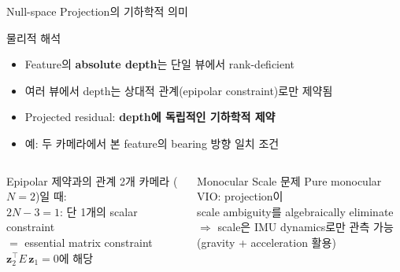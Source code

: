 \begin{frame}{Null-space Projection의 기하학적 의미}
  \begin{block}{물리적 해석}
    \begin{itemize}
      \item Feature의 \textbf{absolute depth}는 단일 뷰에서 rank-deficient
      \item 여러 뷰에서 depth는 상대적 관계(epipolar constraint)로만 제약됨
      \item Projected residual: \textbf{depth에 독립적인 기하학적 제약}
      \item 예: 두 카메라에서 본 feature의 bearing 방향 일치 조건
    \end{itemize}
  \end{block}
  \begin{columns}[T]
      \begin{exampleblock}{Epipolar 제약과의 관계}
        2개 카메라 ($N=2$)일 때:\\
        $2N - 3 = 1$: 단 1개의 scalar constraint\\
        $=$ essential matrix constraint\\
        $\bm{z}_2^\top E\, \bm{z}_1 = 0$에 해당
      \end{exampleblock}
      \begin{alertblock}{Monocular Scale 문제}
        Pure monocular VIO: projection이\\
        scale ambiguity를 algebraically eliminate\\
        $\Rightarrow$ scale은 IMU dynamics로만 관측 가능\\
        (gravity + acceleration 활용)
      \end{alertblock}
  \end{columns}
\end{frame}

